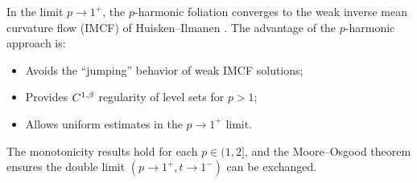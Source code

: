 \begin{remark}
In the limit $p \to 1^+$, the $p$-harmonic foliation converges to the weak inverse mean curvature flow (IMCF) of Huisken--Ilmanen \cite{huisken2001}. The advantage of the $p$-harmonic approach is:
\begin{itemize}
    \item Avoids the ``jumping'' behavior of weak IMCF solutions;
    \item Provides $C^{1,\beta}$ regularity of level sets for $p > 1$;
    \item Allows uniform estimates in the $p \to 1^+$ limit.
\end{itemize}
The monotonicity results hold for each $p \in (1,2]$, and the Moore--Osgood theorem ensures the double limit $(p \to 1^+, t \to 1^-)$ can be exchanged.
\end{remark}


